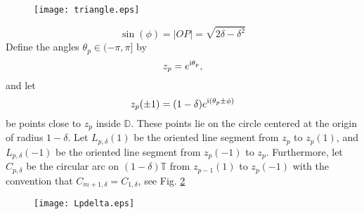 \documentclass{article}
\numberwithin{equation}{section}
\numberwithin{figure}{section}
\theoremstyle{plain}
\theoremstyle{plain}
\numberwithin{thm}{section}
\theoremstyle{remark}
\newcommand{\T}{\mathbb{T}}
\newcommand{\D}{\mathbb{D}}
\newcommand{\I}{{\rm i}}
\begin{document}
 \begin{figure}
 \begin{center}
 \texttt{[image: triangle.eps]}
 \caption{ }
 \label{Fig:Geo}
 \end{center}
 \end{figure}

\begin{equation}\label{Defphi}
\sin(\phi)=|OP|=\sqrt{2\delta-\delta^2}
\end{equation}
Define the angles $\theta_p\in(-\pi,\pi]$ by
\begin{equation}\label{zp}
z_p=e^{\I\theta_p},
\end{equation}
and let
\begin{equation*}
z_p(\pm 1)=(1-\delta)e^{\I(\theta_p\pm \phi)}
\end{equation*}
be points close to $z_p$ inside $\D$. These points lie on the circle centered at the origin of radius $1-\delta$. Let $L_{p,\delta}(1)$ be the oriented line segment from $z_p$ to 
$z_p(1)$, and $L_{p,\delta}(-1)$ be the oriented line segment from $z_p(-1)$ to $z_p$. Furthermore, let $C_{p,\delta}$ be the circular arc on $(1-\delta)\T$ from $z_{p-1}(1)$ to $z_p(-1)$
with the convention that $C_{m+1,\delta}=C_{1,\delta}$, see Fig. \ref{Fig:Local}

\begin{figure}
\begin{center}
\texttt{[image: Lpdelta.eps]}
\caption{ }
\label{Fig:Local}
\end{center}
\end{figure}
\end{document}
